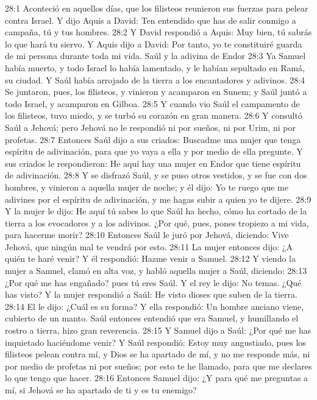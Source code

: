 28:1 Aconteció en aquellos días, que los filisteos reunieron sus fuerzas para pelear contra Israel. Y dijo Aquis a David: Ten entendido que has de salir conmigo a campaña, tú y tus hombres.  
28:2 Y David respondió a Aquis: Muy bien, tú sabrás lo que hará tu siervo. Y Aquis dijo a David: Por tanto, yo te constituiré guarda de mi persona durante toda mi vida.  
Saúl y la adivina de Endor  
28:3 Ya Samuel había muerto, y todo Israel lo había lamentado, y le habían sepultado en Ramá, su ciudad. Y Saúl había arrojado de la tierra a los encantadores y adivinos. 
28:4 Se juntaron, pues, los filisteos, y vinieron y acamparon en Sunem; y Saúl juntó a todo Israel, y acamparon en Gilboa.  
28:5 Y cuando vio Saúl el campamento de los filisteos, tuvo miedo, y se turbó su corazón en gran manera.  
28:6 Y consultó Saúl a Jehová; pero Jehová no le respondió ni por sueños, ni por Urim, ni por profetas.  
28:7 Entonces Saúl dijo a sus criados: Buscadme una mujer que tenga espíritu de adivinación, para que yo vaya a ella y por medio de ella pregunte. Y sus criados le respondieron: He aquí hay una mujer en Endor que tiene espíritu de adivinación.  
28:8 Y se disfrazó Saúl, y se puso otros vestidos, y se fue con dos hombres, y vinieron a aquella mujer de noche; y él dijo: Yo te ruego que me adivines por el espíritu de adivinación, y me hagas subir a quien yo te dijere.  
28:9 Y la mujer le dijo: He aquí tú sabes lo que Saúl ha hecho, cómo ha cortado de la tierra a los evocadores y a los adivinos. ¿Por qué, pues, pones tropiezo a mi vida, para hacerme morir?  
28:10 Entonces Saúl le juró por Jehová, diciendo: Vive Jehová, que ningún mal te vendrá por esto.  
28:11 La mujer entonces dijo: ¿A quién te haré venir? Y él respondió: Hazme venir a Samuel.  
28:12 Y viendo la mujer a Samuel, clamó en alta voz, y habló aquella mujer a Saúl, diciendo: 
28:13 ¿Por qué me has engañado? pues tú eres Saúl. Y el rey le dijo: No temas. ¿Qué has visto? Y la mujer respondió a Saúl: He visto dioses que suben de la tierra.  
28:14 El le dijo: ¿Cuál es su forma? Y ella respondió: Un hombre anciano viene, cubierto de un manto. Saúl entonces entendió que era Samuel, y humillando el rostro a tierra, hizo gran reverencia.  
28:15 Y Samuel dijo a Saúl: ¿Por qué me has inquietado haciéndome venir? Y Saúl respondió: Estoy muy angustiado, pues los filisteos pelean contra mí, y Dios se ha apartado de mí, y no me responde más, ni por medio de profetas ni por sueños; por esto te he llamado, para que me declares lo que tengo que hacer.  
28:16 Entonces Samuel dijo: ¿Y para qué me preguntas a mí, si Jehová se ha apartado de ti y es tu enemigo?  

